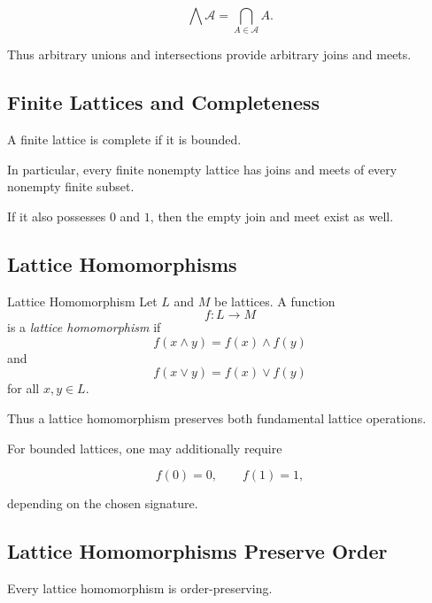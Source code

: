 \[ \bigwedge\mathcal A=\bigcap_{A\in\mathcal A}A. \]

Thus arbitrary unions and intersections provide arbitrary joins and meets.

\subsection{Finite Lattices and Completeness}
\label{subsec:finite-lattice-completeness}

A finite lattice is complete if it is bounded.

In particular, every finite nonempty lattice has joins and meets of every
nonempty finite subset.

If it also possesses \(0\) and \(1\), then the empty join and meet exist as
well.

\subsection{Lattice Homomorphisms}
\label{subsec:lattice-homomorphisms}

\begin{definitionbox}{Lattice Homomorphism}
Let \(L\) and \(M\) be lattices. A function
\[ f:L\to M \]
is a \emph{lattice homomorphism} if
\[ f(x\wedge y)=f(x)\wedge f(y) \]
and
\[ f(x\vee y)=f(x)\vee f(y) \]
for all \(x,y\in L\).
\end{definitionbox}

Thus a lattice homomorphism preserves both fundamental lattice operations.

For bounded lattices, one may additionally require

\[ f(0)=0,\qquad f(1)=1, \]

depending on the chosen signature.

\subsection{Lattice Homomorphisms Preserve Order}
\label{subsec:lattice-hom-preserve-order}

\begin{theorem}
Every lattice homomorphism is order-preserving.
\end{theorem}

